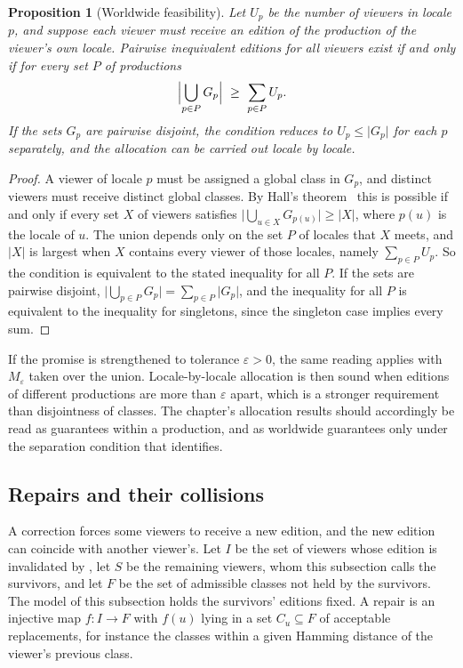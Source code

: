 \documentclass[11pt,twoside,openright]{book}
\theoremstyle{plain}
\newtheorem{proposition}[theorem]{Proposition}
\theoremstyle{definition}
\theoremstyle{remark}
\begin{document}
\begin{proposition}[Worldwide feasibility]\label{prop:global}
Let $U_p$ be the number of viewers in locale $p$, and suppose each viewer must receive an edition of the production of the viewer's own locale. Pairwise inequivalent editions for all viewers exist if and only if for every set $P$ of productions
\[
\Bigl\lvert\bigcup_{p\in P}G_p\Bigr\rvert\ \ge\ \sum_{p\in P}U_p .
\]
If the sets $G_p$ are pairwise disjoint, the condition reduces to $U_p\le\lvert G_p\rvert$ for each $p$ separately, and the allocation can be carried out locale by locale.
\end{proposition}

\begin{proof}
A viewer of locale $p$ must be assigned a global class in $G_p$, and distinct viewers must receive distinct global classes. By Hall's theorem~\cite{hall1935} this is possible if and only if every set $X$ of viewers satisfies $\lvert\bigcup_{u\in X}G_{p(u)}\rvert\ge\lvert X\rvert$, where $p(u)$ is the locale of $u$. The union depends only on the set $P$ of locales that $X$ meets, and $\lvert X\rvert$ is largest when $X$ contains every viewer of those locales, namely $\sum_{p\in P}U_p$. So the condition is equivalent to the stated inequality for all $P$. If the sets are pairwise disjoint, $\lvert\bigcup_{p\in P}G_p\rvert=\sum_{p\in P}\lvert G_p\rvert$, and the inequality for all $P$ is equivalent to the inequality for singletons, since the singleton case implies every sum.
\end{proof}

If the promise is strengthened to tolerance $\varepsilon>0$, the same reading applies with $M_\varepsilon$ taken over the union. Locale-by-locale allocation is then sound when editions of different productions are more than $\varepsilon$ apart, which is a stronger requirement than disjointness of classes. The chapter's allocation results should accordingly be read as guarantees within a production, and as worldwide guarantees only under the separation condition that  identifies.

\subsection{Repairs and their collisions}

A correction forces some viewers to receive a new edition, and the new edition can coincide with another viewer's. Let $I$ be the set of viewers whose edition is invalidated by , let $S$ be the remaining viewers, whom this subsection calls the survivors, and let $F$ be the set of admissible classes not held by the survivors. The model of this subsection holds the survivors' editions fixed. A repair is an injective map $f:I\to F$ with $f(u)$ lying in a set $C_u\subseteq F$ of acceptable replacements, for instance the classes within a given Hamming distance of the viewer's previous class.
\end{document}
